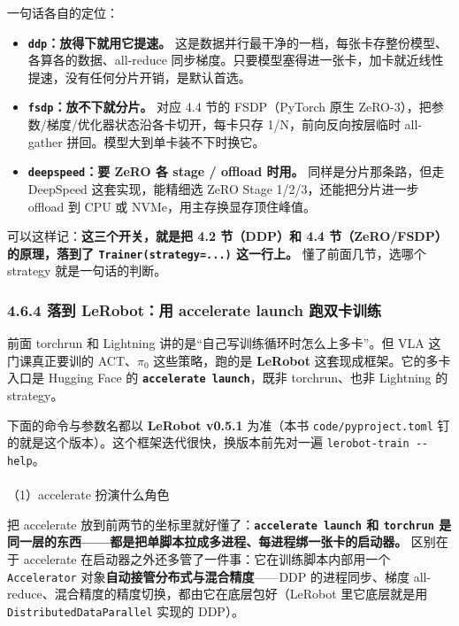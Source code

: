\documentclass[
  chinese,
]{ctexart}
\makeatletter
\let\oldparagraph\paragraph
\renewcommand{\paragraph}{
    \@ifstar
      \xxxParagraphStar
      \xxxParagraphNoStar
  }
\newcommand{\xxxParagraphStar}[1]{\oldparagraph*{#1}\mbox{}}
\newcommand{\xxxParagraphNoStar}[1]{\oldparagraph{#1}\mbox{}}
\providecommand{\tightlist}{%
  \setlength{\itemsep}{0pt}\setlength{\parskip}{0pt}}
\makeatother
\begin{document}
一句话各自的定位：

\begin{itemize}
\tightlist
\item
  \textbf{\texttt{ddp}：放得下就用它提速。}
  这是数据并行最干净的一档，每张卡存整份模型、各算各的数据、all-reduce
  同步梯度。只要模型塞得进一张卡，加卡就近线性提速，没有任何分片开销，是默认首选。
\item
  \textbf{\texttt{fsdp}：放不下就分片。} 对应 4.4 节的 FSDP（PyTorch
  原生 ZeRO-3），把参数/梯度/优化器状态沿各卡切开，每卡只存
  1/N，前向反向按层临时 all-gather 拼回。模型大到单卡装不下时换它。
\item
  \textbf{\texttt{deepspeed}：要 ZeRO 各 stage / offload 时用。}
  同样是分片那条路，但走 DeepSpeed 这套实现，能精细选 ZeRO Stage
  1/2/3，还能把分片进一步 offload 到 CPU 或 NVMe，用主存换显存顶住峰值。
\end{itemize}

可以这样记：\textbf{这三个开关，就是把 4.2 节（DDP）和 4.4
节（ZeRO/FSDP）的原理，落到了 \texttt{Trainer(strategy=...)} 这一行上。}
懂了前面几节，选哪个 strategy 就是一句话的判断。

\subsubsection{4.6.4 落到 LeRobot：用 accelerate launch
跑双卡训练}\label{ux843dux5230-lerobotux7528-accelerate-launch-ux8dd1ux53ccux5361ux8badux7ec3}

前面 torchrun 和 Lightning 讲的是``自己写训练循环时怎么上多卡''。但 VLA
这门课真正要训的 ACT、\(\pi_0\) 这些策略，跑的是 \textbf{LeRobot}
这套现成框架。它的多卡入口是 Hugging Face 的
\textbf{\texttt{accelerate\ launch}}，既非 torchrun、也非 Lightning 的
strategy。

下面的命令与参数名都以 \textbf{LeRobot v0.5.1} 为准（本书
\texttt{code/pyproject.toml}
钉的就是这个版本）。这个框架迭代很快，换版本前先对一遍
\texttt{lerobot-train\ -\/-help}。

\paragraph{（1）accelerate
扮演什么角色}\label{accelerate-ux626eux6f14ux4ec0ux4e48ux89d2ux8272}

把 accelerate
放到前两节的坐标里就好懂了：\textbf{\texttt{accelerate\ launch} 和
\texttt{torchrun}
是同一层的东西------都是把单脚本拉成多进程、每进程绑一张卡的启动器。}
区别在于 accelerate 在启动器之外还多管了一件事：它在训练脚本内部用一个
\texttt{Accelerator} 对象\textbf{自动接管分布式与混合精度}------DDP
的进程同步、梯度
all-reduce、混合精度的精度切换，都由它在底层包好（LeRobot 里它底层就是用
\texttt{DistributedDataParallel} 实现的 DDP）。
\end{document}
